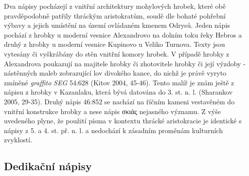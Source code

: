 Dva nápisy pocházejí z vnitřní architektury mohylových hrobek, které obě pravděpodobně patřily thráckým aristokratům, soudě dle bohaté pohřební výbavy a jejich umístění na území ovládaném kmenem Odrysů. Jeden nápis pochází z hrobky u moderní vesnice Alexandrovo na dolním toku řeky Hebros a druhý z hrobky u moderní vesnice Kupinovo u Veliko Turnova. Texty jsou vytesány či vyškrábány do stěn vnitřní komory hrobek. V případě hrobky z Alexandrova poukazují na majitele hrobky či zhotovitele hrobky či její výzdoby - nástěnných maleb zobrazující lov divokého kance, do nichž je právě vyryto zmíněné {\em graffito} {\em SEG} 54:628 (Kitov 2004, 45-46). Tento malíř je znám ještě z nápisu z hrobky v Kazanlaku, která bývá datována do 3. st. n. l. (Sharankov 2005, 29-35). Druhý nápis 46:852 se nachází na říčním kameni vestavěném do vnitřní konstrukce hrobky a nese nápis σκιάς nejasného významu. Z výše uvedeného plyne, že použití písma v kontextu thrácké aristokracie je identické s nápisy z 5. a 4. st. př. n. l. a nedochází k zásadním proměnám kulturních zvyklostí.

\subsection[dedikační-nápisy-4]{Dedikační nápisy}

